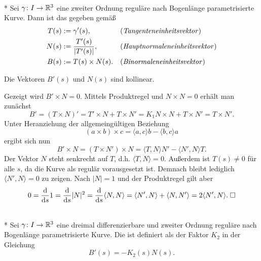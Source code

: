 \begin{definition}\mbox{}\\*
Sei $\gamma\colon I\to\mathbb R^3$ eine zweiter Ordnung reguläre
nach Bogenlänge parametrisierte Kurve. Dann ist das  gegeben gemäß
\begin{align}
T(s) &:= \gamma'(s), && \text{(\emph{Tangenteneinheitsvektor})}\\
N(s) &:= \frac{T'(s)}{|T'(s)|}, && \text{(\emph{Hauptnormaleneinheitsvektor})}\\
B(s) &:= T(s)\times N(s). && \text{(\emph{Binormaleneinheitsvektor})}
\end{align}
\end{definition}

\begin{theorem}\label{Bstrich-kollinear-zu-N}
Die Vektoren $B'(s)$ und $N(s)$ sind kollinear.
\end{theorem}

\noindent{}
Gezeigt wird $B'\times N=0$. Mittels Produktregel und $N\times N=0$
erhält man zunächst%
\begin{equation}
B' = (T\times N)' = T'\times N+T\times N'
= K_1 N\times N + T\times N' = T\times N'.
\end{equation}
Unter Heranziehung der allgemeingültigen Beziehung
\begin{equation}\label{eq:Grassmann-Identitaet}
(a\times b)\times c = \langle a,c\rangle b - \langle b,c\rangle a
\end{equation}
ergibt sich nun
\begin{equation}
B'\times N = (T\times N')\times N
= \langle T,N\rangle N' - \langle N',N\rangle T.
\end{equation}
Der Vektor $N$ steht senkrecht auf $T$, d.h.
$\langle T,N\rangle=0$. Außerdem ist $T(s)\ne 0$ für alle $s$,
da die Kurve als regulär vorausgesetzt ist. Demnach bleibt lediglich
$\langle N',N\rangle=0$ zu zeigen. Nach $|N|=1$ und der Produktregel
gilt aber%
\begin{equation}
0 = \frac{\mathrm d}{\mathrm ds} 1 = \frac{\mathrm d}{\mathrm ds} |N|^2
= \frac{\mathrm d}{\mathrm ds} \langle N,N\rangle
= \langle N',N\rangle + \langle N,N'\rangle
= 2\langle N',N\rangle.\;\Box
\end{equation}


\begin{definition}[Torsion]\label{Torsion}\mbox{}\\*
Sei $\gamma\colon I\to\mathbb R^3$ eine dreimal differenzierbare und
zweiter Ordnung reguläre nach Bogenlänge parametrisierte Kurve.
Die  ist definiert als der Faktor $K_2$ in der Gleichung%
\begin{equation}
B'(s) = -K_2(s)N(s).
\end{equation}
\end{definition}

